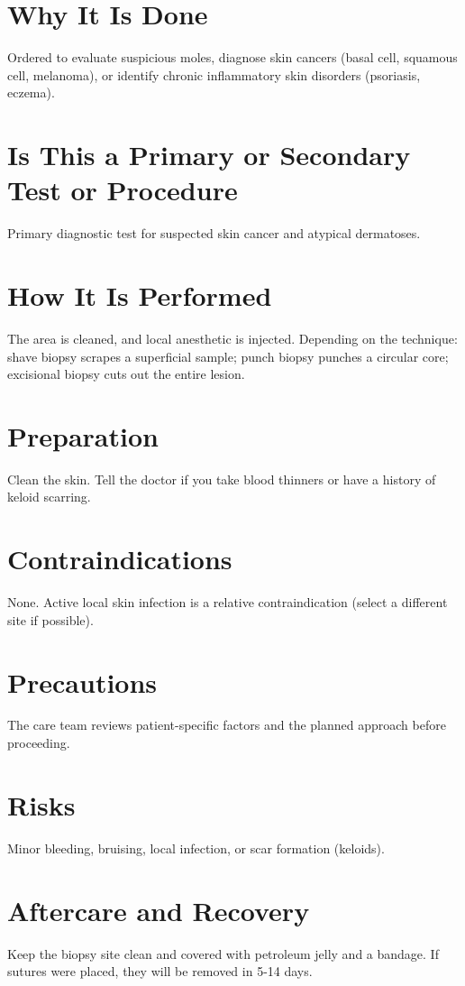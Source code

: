 \section*{Why It Is Done}
Ordered to evaluate suspicious moles, diagnose skin cancers (basal cell, squamous cell, melanoma), or identify chronic inflammatory skin disorders (psoriasis, eczema).

\section*{Is This a Primary or Secondary Test or Procedure}
Primary diagnostic test for suspected skin cancer and atypical dermatoses.

\section*{How It Is Performed}
The area is cleaned, and local anesthetic is injected. Depending on the technique: shave biopsy scrapes a superficial sample; punch biopsy punches a circular core; excisional biopsy cuts out the entire lesion.

\section*{Preparation}
Clean the skin. Tell the doctor if you take blood thinners or have a history of keloid scarring.

\section*{Contraindications}
None. Active local skin infection is a relative contraindication (select a different site if possible).

\section*{Precautions}
The care team reviews patient-specific factors and the planned approach before proceeding.

\section*{Risks}
Minor bleeding, bruising, local infection, or scar formation (keloids).

\section*{Aftercare and Recovery}
Keep the biopsy site clean and covered with petroleum jelly and a bandage. If sutures were placed, they will be removed in 5-14 days.

